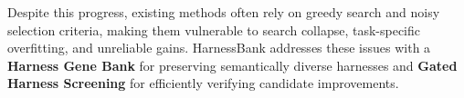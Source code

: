 Despite this progress, existing methods often rely on greedy search and noisy selection criteria, making them vulnerable to search collapse, task-specific overfitting, and unreliable gains. HarnessBank addresses these issues with a \textbf{Harness Gene Bank} for preserving semantically diverse harnesses and \textbf{Gated Harness Screening} for efficiently verifying candidate improvements.